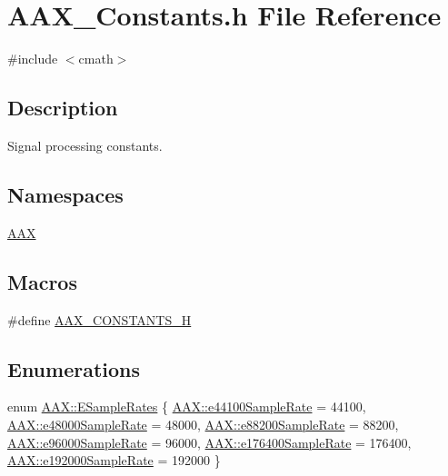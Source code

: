 \hypertarget{a00752}{}\section{A\+A\+X\+\_\+\+Constants.\+h File Reference}
\label{a00752}
{\ttfamily \#include $<$cmath$>$}\newline


\subsection{Description}
Signal processing constants. 

\subsection*{Namespaces}
\begin{DoxyCompactItemize}
\item 
 \mbox{\hyperlink{a00852}{A\+AX}}
\end{DoxyCompactItemize}
\subsection*{Macros}
\begin{DoxyCompactItemize}
\item 
\#define \mbox{\hyperlink{a00752_a433d1b1995004b862ef494090e51e673}{A\+A\+X\+\_\+\+C\+O\+N\+S\+T\+A\+N\+T\+S\+\_\+H}}
\end{DoxyCompactItemize}
\subsection*{Enumerations}
\begin{DoxyCompactItemize}
\item 
enum \mbox{\hyperlink{a00852_a60daf5874c02a01d2af8c582c0643e2d}{A\+A\+X\+::\+E\+Sample\+Rates}} \{ \newline
\mbox{\hyperlink{a00852_a60daf5874c02a01d2af8c582c0643e2da0fabb364c77d1597745ea7faede310a9}{A\+A\+X\+::e44100\+Sample\+Rate}} = 44100, 
\mbox{\hyperlink{a00852_a60daf5874c02a01d2af8c582c0643e2dabf618a3399a754a6ec3a367c102f8850}{A\+A\+X\+::e48000\+Sample\+Rate}} = 48000, 
\mbox{\hyperlink{a00852_a60daf5874c02a01d2af8c582c0643e2da6b2f92d94b3c151993d544d924321620}{A\+A\+X\+::e88200\+Sample\+Rate}} = 88200, 
\mbox{\hyperlink{a00852_a60daf5874c02a01d2af8c582c0643e2da1161e560e2b301b8b45d17083696915e}{A\+A\+X\+::e96000\+Sample\+Rate}} = 96000, 
\newline
\mbox{\hyperlink{a00852_a60daf5874c02a01d2af8c582c0643e2da17be0028e4f2ca09f095573240cef263}{A\+A\+X\+::e176400\+Sample\+Rate}} = 176400, 
\mbox{\hyperlink{a00852_a60daf5874c02a01d2af8c582c0643e2da755a96e92d23adf2ad3546551e2ad49c}{A\+A\+X\+::e192000\+Sample\+Rate}} = 192000
 \}
\end{DoxyCompactItemize}
